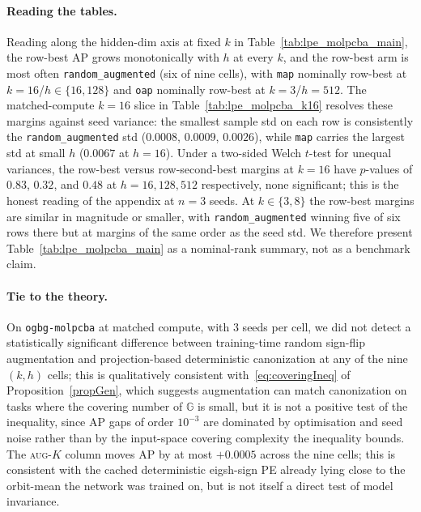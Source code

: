 \documentclass{article}
\theoremstyle{definition}
\theoremstyle{plain}
\newcommand{\G}{\mathbb{G}}
\begin{document}
\paragraph{Reading the tables.}
Reading along the hidden-dim axis at fixed $k$ in
Table~\ref{tab:lpe_molpcba_main}, the row-best AP grows monotonically
with $h$ at every $k$, and the row-best arm is most often
\texttt{random\_augmented} (six of nine cells), with \texttt{map}
nominally row-best at $k\!=\!16$/$h\!\in\!\{16,128\}$ and \texttt{oap}
nominally row-best at $k\!=\!3$/$h\!=\!512$. The matched-compute
$k\!=\!16$ slice in Table~\ref{tab:lpe_molpcba_k16} resolves these
margins against seed variance: the smallest sample std on each row
is consistently the \texttt{random\_augmented} std ($0.0008$,
$0.0009$, $0.0026$), while \texttt{map} carries the largest std at
small $h$ ($0.0067$ at $h\!=\!16$). Under a two-sided Welch
$t$-test for unequal variances, the row-best versus row-second-best
margins at $k\!=\!16$ have $p$-values of $0.83$, $0.32$, and $0.48$
at $h\!=\!16,128,512$ respectively, none significant; this is the
honest reading of the appendix at $n\!=\!3$ seeds. At $k\!\in\!\{3,8\}$
the row-best margins are similar in magnitude or smaller, with
\texttt{random\_augmented} winning five of six rows there but at
margins of the same order as the seed std. We therefore present
Table~\ref{tab:lpe_molpcba_main} as a nominal-rank summary, not as
a benchmark claim.

\paragraph{Tie to the theory.}
On \texttt{ogbg-molpcba} at matched compute, with $3$ seeds per cell,
we did not detect a statistically significant difference between
training-time random sign-flip augmentation and projection-based
deterministic canonization at any of the nine $(k,h)$ cells; this is
qualitatively consistent with~\eqref{eq:coveringIneq} of
Proposition~\ref{propGen}, which suggests augmentation can match
canonization on tasks where the covering number of $\G$ is small,
but it is not a positive test of the inequality, since AP gaps of
order $10^{-3}$ are dominated by optimisation and seed noise rather
than by the input-space covering complexity the inequality bounds.
The \textsc{aug-$K$} column moves AP by at most $+0.0005$ across the
nine cells; this is consistent with the cached deterministic
eigsh-sign PE already lying close to the orbit-mean the network was
trained on, but is not itself a direct test of model invariance.
\end{document}
